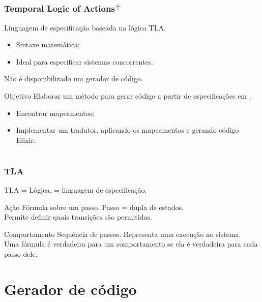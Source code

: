 \documentclass{beamer}
\begin{document}
\begin{frame}
  \frametitle{Temporal Logic of Actions\textsuperscript{+}}

  Linguagem de especificação baseada na lógica TLA.
  \begin{itemize}
    \item Sintaxe matemática;
    \item Ideal para especificar sistemas concorrentes.
  \end{itemize}\medskip

  Não é disponibilizado um gerador de código.\medskip\pause

  \begin{block}{Objetivo}
    Elaborar um método para gerar código a partir de especificações em \TLA.
    \begin{itemize}
      \item Encontrar mapeamentos;
      \item Implementar um tradutor, aplicando os mapeamentos e gerando código Elixir.
    \end{itemize}
  \end{block}
\end{frame}

\section{\TLA}

\begin{frame}
  \frametitle{TLA}

  TLA = Lógica. \TLA = linguagem de especificação.\medskip

  \begin{block}{Ação}
    Fórmula sobre um passo. Passo = dupla de estados.\\\medskip
    Permite definir quais transições são permitidas.
  \end{block}

  \begin{block}{Comportamento}
    Sequência de passos. Representa uma execução no sistema.\\\medskip
    Uma fórmula é verdadeira para um comportamento se ela é verdadeira para cada passo dele.
  \end{block}

\end{frame}

\section{Gerador de código}
\end{document}
